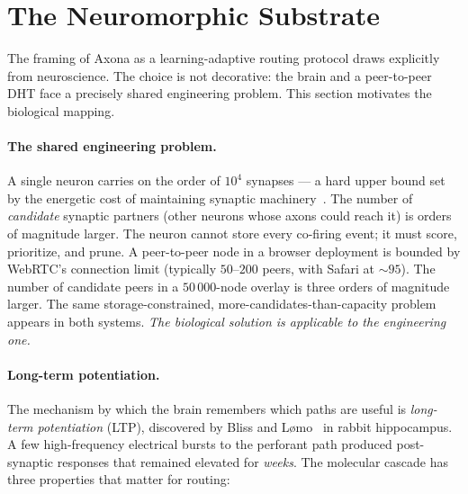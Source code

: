 \documentclass[conference]{IEEEtran}
\newcommand{\axona}{Axona\xspace}
\begin{document}
\section{The Neuromorphic Substrate}
\label{sec:substrate}

The framing of \axona as a learning-adaptive routing protocol
draws explicitly from neuroscience.  The choice is not
decorative: the brain and a peer-to-peer DHT face a precisely
shared engineering problem.  This section motivates the
biological mapping.

\paragraph{The shared engineering problem.}
A single neuron carries on the order of $10^4$ synapses --- a
hard upper bound set by the energetic cost of maintaining
synaptic machinery~\cite{laughlin2003communication}.  The number
of \emph{candidate} synaptic partners (other neurons whose axons
could reach it) is orders of magnitude larger.  The neuron cannot
store every co-firing event; it must score, prioritize, and
prune.  A peer-to-peer node in a browser deployment is bounded by
WebRTC's connection limit (typically $50$--$200$ peers, with
Safari at $\sim\!95$).  The number of candidate peers in a
$50\,000$-node overlay is three orders of magnitude larger.  The
same storage-constrained, more-candidates-than-capacity problem
appears in both systems.  \emph{The biological solution is
applicable to the engineering one.}

\paragraph{Long-term potentiation.}
The mechanism by which the brain remembers which paths are
useful is \emph{long-term potentiation} (LTP), discovered by
Bliss and L\o{}mo~\cite{bliss1973long} in rabbit hippocampus.  A
few high-frequency electrical bursts to the perforant path
produced post-synaptic responses that remained elevated for
\emph{weeks}.  The molecular cascade has three properties that
matter for routing:
\end{document}
